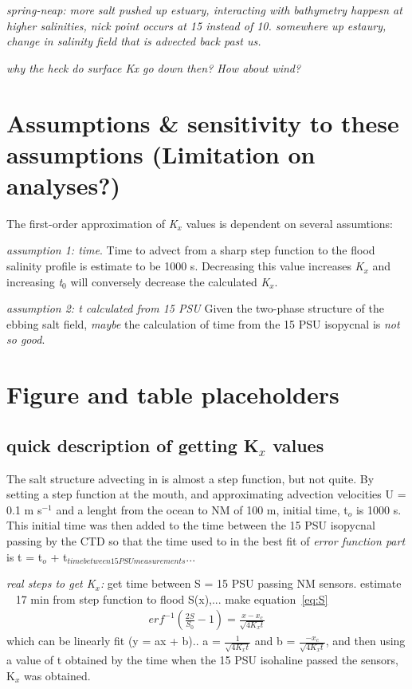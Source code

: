\emph{spring-neap:
more salt pushed up estuary, interacting with bathymetry happesn at higher salinities, nick point occurs at 15 instead of 10. somewhere up estaury, change in salinity field that is advected back past us. }


\emph{why the heck do surface Kx go down then? How about wind?}

\section{Assumptions & sensitivity to these assumptions (Limitation on analyses?)}

The first-order approximation of \emph{K$_x$} values is dependent on several assumtions: 

\emph{assumption 1: time}. Time to advect from a sharp step function to the flood salinity profile is estimate to be 1000 s. Decreasing this value increases \emph{K$_x$} and increasing \emph{t$_0$} will conversely decrease the calculated \emph{K$_x$}. 

\emph{assumption 2: t calculated from 15 PSU} Given the two-phase structure of the ebbing salt field, \emph{maybe} the calculation of time from the 15 PSU isopycnal is \emph{not so good}. 


\section{Figure and table placeholders}



\subsection{quick description of getting K$_x$ values}
The salt structure advecting in is almost a step function, but not quite. By setting a step function at the mouth, and approximating advection velocities U = 0.1 m s$^{-1}$ and a lenght from the ocean to NM of 100 m, initial time, t$_o$ is 1000 s. This initial time was then added to the time between the 15 PSU isopycnal passing by the CTD so that the time used to in the best fit of \emph{error function part} is t = t$_o$ + t$_{time between 15 PSU measurements}$... 

\emph{real steps to get K$_x$:} get time between S = 15 PSU passing NM sensors.  estimate ~ 17 min from step function to flood S(x),... make equation~\ref{eq:S} 
\begin{eqnarray}
erf^{-1}\left(\frac{2S}{S_0}-1\right) = \frac{x-x_c}{\sqrt{4K_xt}} \label{eq:linfitS}
\end{eqnarray}
which can be linearly fit (y = ax + b).. a = $\frac{1}{\sqrt{4K_xt}}$ and b = $\frac{-x_c}{\sqrt{4K_xt}}$, and then using a value of t obtained by the time when the 15 PSU isohaline passed the sensors, K$_x$ was obtained.  



